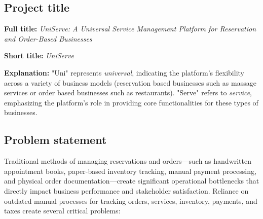 \documentclass[]{VUMIFTemplateClass}
\begin{document}
\subsection{Project title}

\textbf{Full title:} \textit{UniServe: A Universal Service Management Platform for Reservation and Order-Based Businesses}

\textbf{Short title:} \textit{UniServe}


\textbf{Explanation:} "Uni" represents \emph{universal}, indicating the platform's flexibility across a variety of business models 
(reservation based businesses such as massage services or order based businesses such as restaurants). 
"Serve" refers to \emph{service}, emphasizing the platform’s role in providing core functionalities for these types of businesses.

\subsection{Problem statement}

Traditional methods of managing reservations and orders—such as handwritten
appointment books, paper-based inventory tracking, manual payment processing,
and physical order documentation—create significant operational bottlenecks that
directly impact business performance and stakeholder satisfaction. Reliance on
outdated manual processes for tracking orders, services, inventory, payments,
and taxes create several critical problems:
\end{document}
